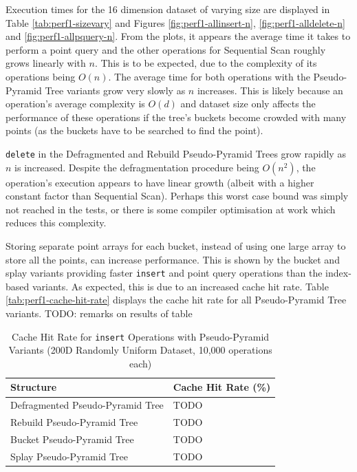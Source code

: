 Execution times for the 16 dimension dataset of varying size are displayed in Table \ref{tab:perf1-sizevary} and Figures \ref{fig:perf1-allinsert-n}, \ref{fig:perf1-alldelete-n} and \ref{fig:perf1-allpquery-n}. From the plots, it appears the average time it takes to perform a point query and the other operations for Sequential Scan roughly grows linearly with $n$. This is to be expected, due to the complexity of its operations being $O(n)$. The average time for both operations with the Pseudo-Pyramid Tree variants grow very slowly as $n$ increases. This is likely because an operation's average complexity is $O(d)$ and dataset size only affects the performance of these operations if the tree's buckets become crowded with many points (as the buckets have to be searched to find the point).

\texttt{delete} in the Defragmented and Rebuild Pseudo-Pyramid Trees grow rapidly as $n$ is increased. Despite the defragmentation procedure being $O(n^2)$, the operation's execution appears to have linear growth (albeit with a higher constant factor than Sequential Scan). Perhaps this worst case bound was simply not reached in the tests, or there is some compiler optimisation at work which reduces this complexity.

Storing separate point arrays for each bucket, instead of using one large array to store all the points, can increase performance. This is shown by the bucket and splay variants providing faster \texttt{insert} and point query operations than the index-based variants. As expected, this is due to an increased cache hit rate. Table \ref{tab:perf1-cache-hit-rate} displays the cache hit rate for all Pseudo-Pyramid Tree variants. TODO: remarks on results of table

\begin{table}
	\centering
	\begin{tabular}{|l|l|}
		\hline
		\textbf{Structure} & \textbf{Cache Hit Rate (\%)} \\
		\hline
		Defragmented Pseudo-Pyramid Tree & TODO \\
		Rebuild Pseudo-Pyramid Tree & TODO \\
		Bucket Pseudo-Pyramid Tree & TODO \\
		Splay Pseudo-Pyramid Tree & TODO \\
		\hline
	\end{tabular}
	\caption{Cache Hit Rate for \texttt{insert} Operations with Pseudo-Pyramid Variants (200D Randomly Uniform Dataset, 10,000 operations each)}
\end{table}


